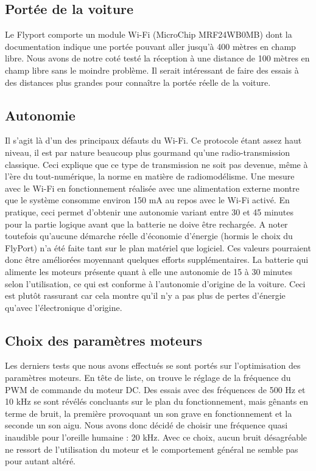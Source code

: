 \documentclass[a4paper,12pt]{report}
\begin{document}
		\subsection{Portée de la voiture}
		 Le Flyport comporte un module Wi-Fi (MicroChip MRF24WB0MB) dont la documentation indique une portée pouvant aller jusqu’à 400 mètres en champ libre. Nous avons de notre coté testé la réception à une distance de 100 mètres en champ libre sans le moindre problème. Il serait intéressant de faire des essais à des distances plus grandes pour connaître la portée réelle de la voiture.
		
		\subsection{Autonomie}
		Il s’agit là d’un des principaux défauts du Wi-Fi. Ce protocole étant assez haut niveau, il est par nature beaucoup plus gourmand qu’une radio-transmission classique. Ceci explique que ce type de transmission ne soit pas devenue, même à l’ère du tout-numérique, la norme en matière de radiomodélisme. Une mesure avec le Wi-Fi en fonctionnement réalisée avec une alimentation externe montre que le système consomme environ 150 mA au repos avec le Wi-Fi activé.
En pratique, ceci permet d’obtenir une autonomie variant entre 30 et 45 minutes pour la partie logique avant que la batterie ne doive être rechargée. A noter toutefois qu’aucune démarche réelle d’économie d’énergie (hormis le choix du FlyPort) n’a été faite tant sur le plan matériel que logiciel. Ces valeurs pourraient donc être améliorées moyennant quelques efforts supplémentaires.
	La batterie qui alimente les moteurs présente quant à elle une autonomie de 15 à 30 minutes selon l’utilisation, ce qui est conforme à l’autonomie d’origine de la voiture. Ceci est plutôt rassurant car cela montre qu’il n’y a pas plus de pertes d’énergie qu’avec l’électronique d’origine.
		
		\subsection{Choix des paramètres moteurs}
		Les derniers tests que nous avons effectués se sont portés sur l’optimisation des paramètres moteurs. En tête de liste, on trouve le réglage de la fréquence du PWM de commande du moteur DC. Des essais avec des fréquences de 500 Hz et 10 kHz se sont révélés concluants sur le plan du fonctionnement, mais gênants en terme de bruit, la première provoquant un son grave en fonctionnement et la seconde un son aigu. Nous avons donc décidé de choisir une fréquence quasi inaudible pour l’oreille humaine : 20 kHz. Avec ce choix, aucun bruit désagréable ne ressort de l’utilisation du moteur et le comportement général ne semble pas pour autant altéré.
\end{document}
